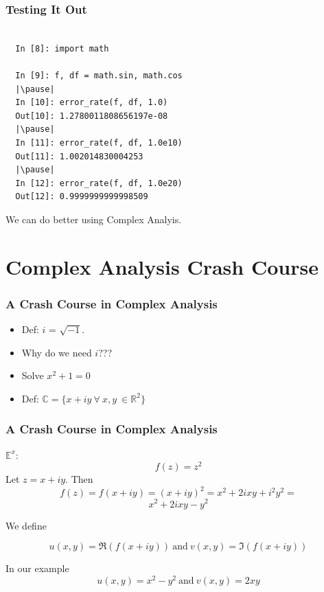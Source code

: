 \documentclass{beamer}
\def\R{\mathbb{R}}                     %
\def\C{\mathbb{C}}                     %
\begin{document}
\begin{frame}[fragile]
\frametitle{Testing It Out}

\begin{lstlisting}

  In [8]: import math

  In [9]: f, df = math.sin, math.cos
  |\pause|
  In [10]: error_rate(f, df, 1.0)
  Out[10]: 1.2780011808656197e-08
  |\pause|
  In [11]: error_rate(f, df, 1.0e10)
  Out[11]: 1.002014830004253
  |\pause|
  In [12]: error_rate(f, df, 1.0e20)
  Out[12]: 0.9999999999998509
\end{lstlisting}

\pause

We can do better \pause using Complex Analyis.

\end{frame}

\section{Complex Analysis Crash Course}

\begin{frame}
\frametitle{A Crash Course in Complex Analysis}

\begin{itemize}[<+->]
  \item Def: $i$ = $\sqrt{-1}$.
  \item Why do we need $i$???
  \item Solve $x^2 + 1 = 0$
  \item Def: $\C = \{x + iy \ \forall \ x,y \ \in \R^2 \}$
\end{itemize}


\end{frame}

\begin{frame}
\frametitle{A Crash Course in Complex Analysis}

$\mathbb{E}^x$:
\[ f(z) = z^2 \]
\pause
Let $z=x+iy$. Then
\[ f(z) = f(x+iy) = (x+iy)^2 = x^2 +2ixy + i^2y^2 = \]
\[ x^2+ 2ixy - y^2 \]

\pause

We define

\[ u(x,y) = \mathfrak{R}(f(x+iy)) \ \mathrm{and} \ v(x,y) = \mathfrak{I}(f(x+iy)) \]

\pause
In our example
\[ u(x,y) = x^2 - y^2 \ \mathrm{and} \ v(x,y) = 2xy \]

\end{frame}
\end{document}
